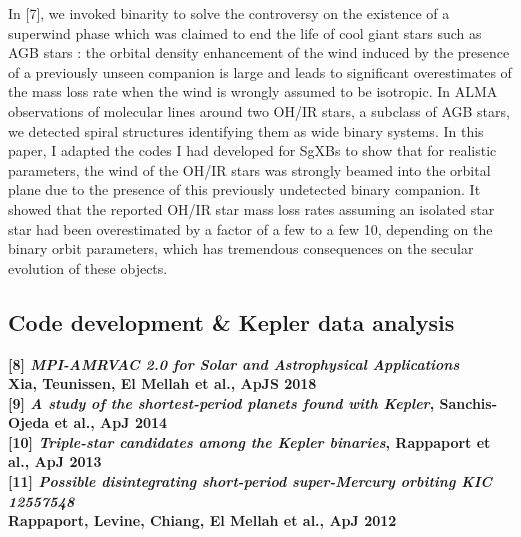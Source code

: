 \documentclass[12pt,onecolumn]{article}
\newcommand{\sgxs}{SgXBs\xspace}
\begin{document}
In [7], we invoked binarity to solve the controversy on the existence of a superwind phase which was claimed to end the life of cool giant stars such as AGB stars : the orbital density enhancement of the wind induced by the presence of a previously unseen companion is large and leads to significant overestimates of the mass loss rate when the wind is wrongly assumed to be isotropic. In ALMA observations of molecular lines around two OH/IR stars, a subclass of AGB stars, we detected spiral structures identifying them as wide binary systems. In this paper, I adapted the codes I had developed for \sgxs to show that for realistic parameters, the wind of the OH/IR stars was strongly beamed into the orbital plane due to the presence of this previously undetected binary companion. It showed that the reported OH/IR star mass loss rates assuming an isolated star star had been overestimated by a factor of a few to a few 10, depending on the binary orbit parameters, which has tremendous consequences on the secular evolution of these objects.

\subsection*{Code development \& Kepler data analysis}

\footnotesize
\textbf{[8] \textit{MPI-AMRVAC 2.0 for Solar and Astrophysical Applications}}\\
\hspace*{16pt}\textbf{Xia, Teunissen, El Mellah et al., ApJS 2018}\\
\textbf{[9] \textit{A study of the shortest-period planets found with Kepler}, Sanchis-Ojeda et al., ApJ 2014}\\
\textbf{[10] \textit{Triple-star candidates among the Kepler binaries}, Rappaport et al., ApJ 2013}\\
\textbf{[11] \textit{Possible disintegrating short-period super-Mercury orbiting KIC 12557548}}\\
\hspace*{21pt}\textbf{Rappaport, Levine, Chiang, El Mellah et al., ApJ 2012}\\

\normalsize
\end{document}
